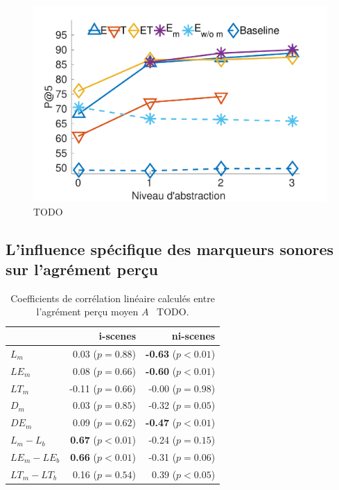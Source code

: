 \begin{figure}[bth]
        \myfloatalign
        \includegraphics[width=.9\linewidth]{gfxXpUrbanSoundscape/pa5_1}
       \caption[TODO]{TODO}\label{fig:pa5}
\end{figure}

\subsection{L'influence spécifique des marqueurs sonores sur l'agrément perçu}

\begin{table}[t]
\centering
\begin{tabular}{l r r} 
               &   i-scenes                   & ni-scenes \\
\hline
$L_m$            & 0.03  ($p=0.88$)           & \textbf{-0.63} ($p<0.01$) \\
$LE_m$           & 0.08  ($p=0.66$)           & \textbf{-0.60} ($p<0.01$) \\
$LT_m$           & -0.11 ($p=0.66$)           & -0.00 ($p=0.98$) \\
$D_m$            & 0.03 ($p=0.85$)            & -0.32 ($p=0.05$) \\
$DE_m$           & 0.09  ($p=0.62$)           & \textbf{-0.47} ($p<0.01$) \\
$L_m-L_b$        & \textbf{0.67} ($p<0.01$)   & -0.24 ($p=0.15$) \\
$LE_m-LE_b$      & \textbf{0.66} ($p<0.01$)   & -0.31 ($p=0.06$) \\
$LT_m-LT_b$      & 0.16 ($p=0.54$)            &  0.39 ($p<0.05$) \\

\hline
\end{tabular}
\vspace{0.5mm}
\caption{Coefficients de corrélation linéaire calculés entre l'agrément perçu moyen $A$ \vs~TODO.}
\label{tab:coorMarkers}
\end{table}

